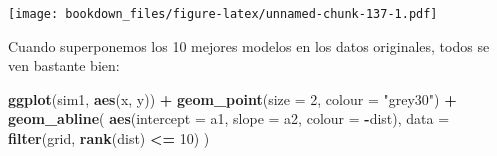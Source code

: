 \documentclass[]{book}
\newenvironment{Shaded}{\begin{snugshade}}{\end{snugshade}}
\newcommand{\DataTypeTok}[1]{\textcolor[rgb]{0.13,0.29,0.53}{#1}}
\newcommand{\DecValTok}[1]{\textcolor[rgb]{0.00,0.00,0.81}{#1}}
\newcommand{\KeywordTok}[1]{\textcolor[rgb]{0.13,0.29,0.53}{\textbf{#1}}}
\newcommand{\NormalTok}[1]{#1}
\newcommand{\OperatorTok}[1]{\textcolor[rgb]{0.81,0.36,0.00}{\textbf{#1}}}
\newcommand{\StringTok}[1]{\textcolor[rgb]{0.31,0.60,0.02}{#1}}
\begin{document}
\begin{Shaded}
\end{Shaded}

\texttt{[image: bookdown\_files/figure-latex/unnamed-chunk-137-1.pdf]}

Cuando superponemos los 10 mejores modelos en los datos originales, todos se ven bastante bien:

\begin{Shaded}
\begin{Highlighting}[]
\KeywordTok{ggplot}\NormalTok{(sim1, }\KeywordTok{aes}\NormalTok{(x, y)) }\OperatorTok{+}\StringTok{ }
\StringTok{  }\KeywordTok{geom_point}\NormalTok{(}\DataTypeTok{size =} \DecValTok{2}\NormalTok{, }\DataTypeTok{colour =} \StringTok{"grey30"}\NormalTok{) }\OperatorTok{+}\StringTok{ }
\StringTok{  }\KeywordTok{geom_abline}\NormalTok{(}
    \KeywordTok{aes}\NormalTok{(}\DataTypeTok{intercept =}\NormalTok{ a1, }\DataTypeTok{slope =}\NormalTok{ a2, }\DataTypeTok{colour =} \OperatorTok{-}\NormalTok{dist), }
    \DataTypeTok{data =} \KeywordTok{filter}\NormalTok{(grid, }\KeywordTok{rank}\NormalTok{(dist) }\OperatorTok{<=}\StringTok{ }\DecValTok{10}\NormalTok{)}
\NormalTok{  )}
\end{Highlighting}
\end{Shaded}
\end{document}
